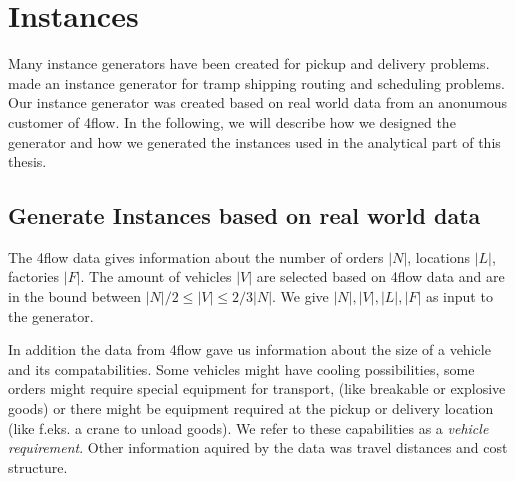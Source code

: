 \documentclass[../main.tex]{subfiles}
\begin{document}
\section{Instances}
\label{sec:ins}
Many instance generators have been created for pickup and delivery problems. \cite{hemmati14} made an instance generator for tramp shipping routing and scheduling problems.
Our instance generator was created based on real world data from an anonumous customer of 4flow.
In the following, we will describe how we designed the generator and how we generated the instances used in the analytical part of this thesis.

\subsection{Generate Instances based on real world data}
\label{sec:data}
The 4flow data gives information about the number of orders $|N|$, locations $|L|$, factories $|F|$. 
The amount of vehicles $|V|$ are selected based on 4flow data and are in the bound between $|N|/2 \leq |V| \leq 2/3 |N|$.
We give $|N|, |V|, |L|, |F|$ as input to the generator.\par
In addition the data from 4flow gave us information about the size of a vehicle and its compatabilities. 
Some vehicles might have cooling possibilities, some orders might require special equipment for transport, (like breakable or explosive goods) or there might be equipment required at the pickup or delivery location (like f.eks. a crane to unload goods).
We refer to these capabilities as a \emph{vehicle requirement}.
Other information aquired by the data was travel distances and cost structure.
\end{document}
